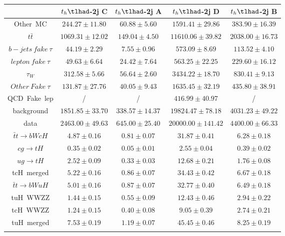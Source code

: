 \begin{tabular}{ccccc} \toprule\toprule
 & $t_{h}\tlhad$-2j C & $t_{h}\tlhad$-2j A & $t_{h}\tlhad$-2j D & $t_{h}\tlhad$-2j B\\\midrule
Other~MC & $244.27\pm11.80$ & $60.88\pm5.60$ & $1591.41\pm29.86$ & $383.90\pm16.39$\\
$t\bar{t}$ & $1069.31\pm12.02$ & $149.04\pm4.50$ & $11610.06\pm39.82$ & $2038.00\pm16.73$\\
$b-jets~fake~\tau$ & $44.19\pm2.29$ & $7.55\pm0.96$ & $573.09\pm8.69$ & $113.52\pm4.10$\\
$lepton~fake~\tau$ & $49.63\pm6.64$ & $24.42\pm7.64$ & $563.25\pm22.25$ & $229.60\pm16.12$\\
$\tau_{W}$ & $312.58\pm5.66$ & $56.64\pm2.60$ & $3434.22\pm18.70$ & $830.41\pm9.13$\\
$Other~Fake~\tau$ & $131.87\pm27.76$ & $40.05\pm9.43$ & $1635.45\pm32.19$ & $435.80\pm38.91$\\
QCD~Fake~lep &  / &  / & $416.99\pm40.97$ &  /\\
background & $1851.85\pm33.70$ & $338.57\pm14.37$ & $19824.47\pm78.18$ & $4031.23\pm49.22$\\
data & $2463.00\pm49.63$ & $645.00\pm25.40$ & $20000.00\pm141.42$ & $4400.00\pm66.33$\\
$\bar{t}t\to bWcH$ & $4.87\pm0.16$ & $0.81\pm0.07$ & $31.87\pm0.41$ & $6.28\pm0.18$\\
$cg\to tH$ & $0.35\pm0.02$ & $0.05\pm0.01$ & $2.55\pm0.04$ & $0.39\pm0.02$\\
$ug\to tH$ & $2.52\pm0.09$ & $0.33\pm0.03$ & $12.68\pm0.21$ & $1.76\pm0.08$\\
tcH~merged & $5.22\pm0.16$ & $0.86\pm0.07$ & $34.43\pm0.42$ & $6.67\pm0.18$\\
$\bar{t}t\to bWuH$ & $5.01\pm0.16$ & $0.87\pm0.07$ & $32.77\pm0.40$ & $6.49\pm0.18$\\
tuH~WWZZ & $1.44\pm0.15$ & $0.55\pm0.09$ & $12.43\pm0.46$ & $2.94\pm0.22$\\
tcH~WWZZ & $1.24\pm0.15$ & $0.40\pm0.08$ & $9.05\pm0.39$ & $2.74\pm0.21$\\
tuH~merged & $7.53\pm0.19$ & $1.19\pm0.07$ & $45.45\pm0.46$ & $8.25\pm0.19$\\
\bottomrule\bottomrule\\
\end{tabular}

